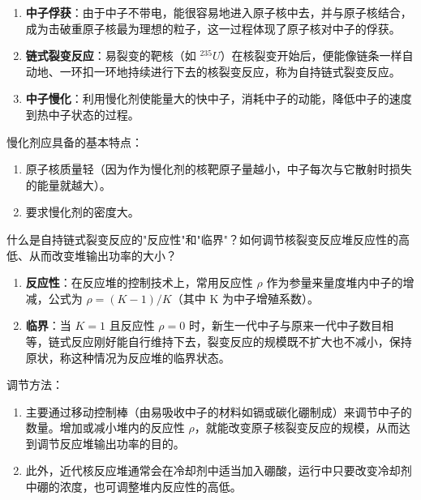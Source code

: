 \begin{solution}
\begin{enumerate}
  \item \textbf{中子俘获}：由于中子不带电，能很容易地进入原子核中去，并与原子核结合，成为击破重原子核最为理想的粒子，这一过程体现了原子核对中子的俘获。
  \item \textbf{链式裂变反应}：易裂变的靶核（如 \(^{235}U\)）在核裂变开始后，便能像链条一样自动地、一环扣一环地持续进行下去的核裂变反应，称为自持链式裂变反应。
  \item \textbf{中子慢化}：利用慢化剂使能量大的快中子，消耗中子的动能，降低中子的速度到热中子状态的过程。
\end{enumerate}

慢化剂应具备的基本特点：
\begin{enumerate}
  \item 原子核质量轻（因为作为慢化剂的核靶原子量越小，中子每次与它散射时损失的能量就越大）。
  \item 要求慢化剂的密度大。
\end{enumerate}
\end{solution}

\begin{problem}
什么是自持链式裂变反应的"反应性"和"临界"？如何调节核裂变反应堆反应性的高低、从而改变堆输出功率的大小？
\end{problem}

\begin{solution}
\begin{enumerate}
  \item \textbf{反应性}：在反应堆的控制技术上，常用反应性 \(\rho\) 作为参量来量度堆内中子的增减，公式为 \(\rho=(K-1)/K\)（其中 K 为中子增殖系数）。
  \item \textbf{临界}：当 \(K=1\) 且反应性 \(\rho=0\) 时，新生一代中子与原来一代中子数目相等，链式反应刚好能自行维持下去，裂变反应的规模既不扩大也不减小，保持原状，称这种情况为反应堆的临界状态。
\end{enumerate}

调节方法：
\begin{enumerate}
  \item 主要通过移动控制棒（由易吸收中子的材料如镉或碳化硼制成）来调节中子的数量。增加或减小堆内的反应性 \(\rho\)，就能改变原子核裂变反应的规模，从而达到调节反应堆输出功率的目的。
  \item 此外，近代核反应堆通常会在冷却剂中适当加入硼酸，运行中只要改变冷却剂中硼的浓度，也可调整堆内反应性的高低。
\end{enumerate}
\end{solution}


